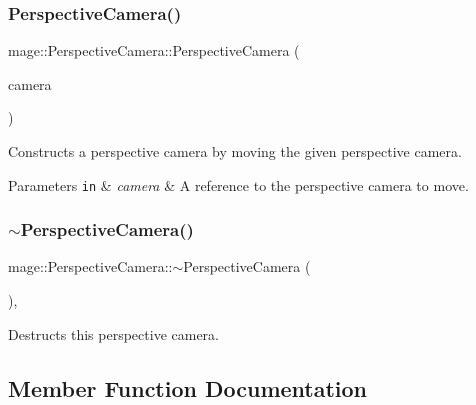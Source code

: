 \subsubsection{\texorpdfstring{Perspective\+Camera()}{PerspectiveCamera()}\hspace{0.1cm}{\footnotesize\ttfamily [4/4]}}
{\footnotesize\ttfamily mage\+::\+Perspective\+Camera\+::\+Perspective\+Camera (\begin{DoxyParamCaption}\item[{\hyperlink{classmage_1_1_perspective_camera}{Perspective\+Camera} \&\&}]{camera }\end{DoxyParamCaption})\hspace{0.3cm}{\ttfamily [default]}}

Constructs a perspective camera by moving the given perspective camera.


\begin{DoxyParams}[1]{Parameters}
\mbox{\tt in}  & {\em camera} & A reference to the perspective camera to move. \\
\hline
\end{DoxyParams}
\hypertarget{classmage_1_1_perspective_camera_a47ba88d7458528795dd832474cdb3eb9}{}\label{classmage_1_1_perspective_camera_a47ba88d7458528795dd832474cdb3eb9} 
\subsubsection{\texorpdfstring{$\sim$\+Perspective\+Camera()}{~PerspectiveCamera()}}
{\footnotesize\ttfamily mage\+::\+Perspective\+Camera\+::$\sim$\+Perspective\+Camera (\begin{DoxyParamCaption}{ }\end{DoxyParamCaption})\hspace{0.3cm}{\ttfamily [virtual]}, {\ttfamily [default]}}

Destructs this perspective camera. 

\subsection{Member Function Documentation}
\hypertarget{classmage_1_1_perspective_camera_a21545965da7ef1b6f99887bb6d2bb095}{}\label{classmage_1_1_perspective_camera_a21545965da7ef1b6f99887bb6d2bb095} 
